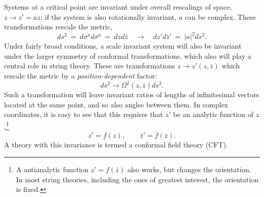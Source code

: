 Systems at a critical point are invariant under overall rescalings
of space, $z \to z' = a z$; if the system is also
rotationally invariant, $a$ can be complex.
These transformations rescale the metric,
\begin{equation}
ds^2 \ =\ d\sigma^a d\sigma^a\ =\ dzd\bar z \quad \to\quad dz'd\bar
z'
\ =\ |a|^2 ds^2.
\end{equation}
Under fairly
broad conditions, a scale invariant system will also be invariant
under the larger symmetry of conformal transformations,
which also will play a central role in string
theory.  These are transformations
$z \to z'(z,\bar z)$ which rescale the metric by a {\it
position-dependent} factor:
\begin{equation}
ds^2 \to \Omega^2(z,\bar z) ds^2.
\end{equation}
Such a transformation will leave invariant ratios of lengths
of infinitesimal vectors located at the same point, and so also
angles between them.  In complex coordinates, it is easy to see that
this requires that $z'$ be an analytic function of
$z$,\footnote
{A antianalytic function $z' = f(\bar z)$ also works, but changes
the orientation.  In most string theories,
including the ones of greatest interest, the orientation is fixed.}
\begin{equation}
z' = f(z), \qquad \bar z' = \bar f(\bar z).
\end{equation}
A theory with this invariance is termed a conformal field theory
(CFT).


